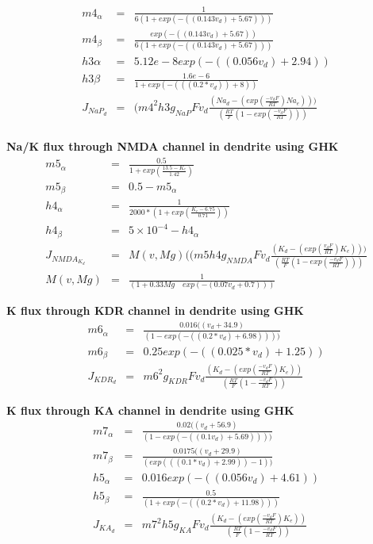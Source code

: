 \documentclass[fleqn]{report}
\numberwithin{equation}{section}
\numberwithin{equation}{section}
\begin{document}
	\begin{eqnarray}
		            m4_{\alpha}    & = &\frac{1}{6  (1 + exp(-((0.143  v_d) + 5.67)))} \\
	                m4_{\beta}     &=& \frac{exp(-((0.143 v_d) + 5.67))}{6  (1 + exp(-((0.143  v_d) + 5.67)))}\\ 
	            h3{\alpha}     &=& 5.12e-8  exp(-((0.056  v_d) + 2.94))\\
	            h3{\beta}      &=& \frac{1.6e-6}{1 + exp(-(((0.2 * v_d)) + 8))}\\
	            J_{NaP_{d}}     &=& (m4^2  h3  g_{NaP} F v_d \frac{(Na_d - (exp(\frac{-v_d F}{RT})  Na_e)))}{(\frac{RT}{F} (1 - exp(\frac{-v_d F}{RT})))} \\
	\end{eqnarray}

	
 \textbf{Na/K flux through NMDA channel in dendrite using GHK}
 \begin{eqnarray}
	            m5_{\alpha}     &=& \frac{0.5}{1 + exp(\frac{13.5 - K_e}{1.42})}\\
	            m5_{\beta}      &=& 0.5 - m5_{\alpha}\\
	            h4_{\alpha}     &=& \frac{1}{2000 * (1 + exp(\frac{K_e - 6.75}{0.71}))}\\
	            h4_{\beta}      &=& 5 \times 10^{-4} - h4_{\alpha}\\
	            J_{NMDA_{K_d}}   & =& M(v,Mg)( (m5  h4  g_{NMDA} F v_d  \frac{(K_d - (exp(\frac{v_d F}{RT})  K_e)))}{(\frac{RT}{F} (1 - exp(\frac{-v_d F}{RT})))}\\
	            M(v,Mg)&=& \frac{1}{(1 + 0.33Mg  \quad exp(-(0.07  v_d + 0.7)))}
 \end{eqnarray}

%	
%	            
 \textbf{K flux through KDR channel in dendrite using GHK}
 \begin{eqnarray}
	            m6_{\alpha}     &=&\frac{0.016  ((v_d + 34.9)}{(1 - exp(-((0.2 * v_d) + 6.98))))}\\
	            m6_{\beta}      &=&  0.25 exp(-((0.025 * v_d) + 1.25))\\
	           J_{KDR_{d}}    & =& m6^2  g_{KDR} F v_d \frac{(K_d - (exp(\frac{-v_d F}{RT})  K_e))}{(\frac{RT}{F} (1 - \frac{-v_d F}{RT}))}
 \end{eqnarray}

%	
\textbf{ K flux through KA channel in dendrite using GHK}
\begin{eqnarray}
	            m7_{\alpha}     &=& \frac{0.02  ((v_d + 56.9)}{(1 - exp(-((0.1  v_d) + 5.69))))}\\
	            m7_{\beta}      &=&  \frac{0.0175  ((v_d + 29.9)}{(exp(((0.1 * v_d) + 2.99)) - 1))}\\
	            h5_{\alpha}     &=& 0.016  exp(-((0.056 v_d) + 4.61))\\
	            h5_{\beta}      &=&\frac{0.5}{(1 + exp(-((0.2 * v_d) + 11.98)))}\\
	            J_{KA_{d}}     & =& m7^2  h5 g_{KA} F v_d  \frac{(K_d - (exp(\frac{-v_d F}{RT})  K_e))}{(\frac{RT}{F} (1 - \frac{-v_d F}{RT}))}
\end{eqnarray}	
\end{document}
